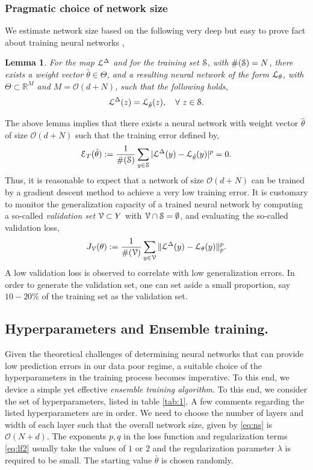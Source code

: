 \documentclass[a4paper]{article}
\numberwithin{equation}{section}
\newtheorem{lemma}[theorem]{Lemma}
\numberwithin{equation}{section}
\theoremstyle{definition}
\theoremstyle{myremarkstyle}
\newcommand{\R}{\mathbb{R}}
\newcommand{\cO}{{\mathcal O}}
\newcommand{\map}{\EuScript{L}}
\newcommand{\train}{\EuScript{S}}
\newcommand{\val}{\EuScript{V}}
\newcommand{\er}{\EuScript{E}}
\begin{document}
\subsubsection{Pragmatic choice of network size}
We estimate network size based on the following very deep but easy to prove fact about training neural networks \cite{REC1},
\begin{lemma}
\label{lem:1}
For the map $\map^{\Delta}$ and for the training set $\train$, with $\#(\train) = N$, there exists a weight vector $\hat{\theta} \in \Theta$, and a resulting neural network of the form $\map_{\theta}$, with $\Theta \subset \R^M$ and $M = {\mathcal O} (d + N)$, such that the following holds,
\begin{equation}
\label{eq:lem1}
\map^{\Delta}(z) = \map_{\hat{\theta}} (z), \quad \forall~ z \in \train.
\end{equation}
\end{lemma}
The above lemma implies that there exists a neural network with weight vector $\hat{\theta}$  of size ${\mathcal O}(d+N)$ such that the training error defined by,
\begin{equation}
\label{eq:ert}
\er_{T} (\hat{\theta}) : = \frac{1}{\#(\train)}\sum\limits_{y \in \train} |\map^{\Delta}(y) - \map_{\hat{\theta}} (y) |^p = 0.
\end{equation}
Thus, it is reasonable to expect that a network of size $\cO(d + N)$ can be trained by a gradient descent method to achieve a very low training error.
It is customary to monitor the generalization capacity of a trained neural network by computing a so-called \emph{validation set} $\val \subset Y$ with $\val \cap \train = \emptyset$, and evaluating the so-called validation loss,
\begin{equation}
\label{eq:vlf}
J_{\val} (\theta) : = \frac{1}{\#(\val)}\sum\limits_{y \in \val} \|\map^{\Delta}(y) - \map_{\theta} (y) \|_p^p.
\end{equation}
A low validation loss is observed to correlate with low generalization errors. In order to generate the validation set, one can set aside a small proportion, say $10-20\%$ of the training set as the validation set. 
\subsection{Hyperparameters and Ensemble training.}
Given the theoretical challenges of determining neural networks that can provide low prediction errors in our data poor regime, a suitable choice of the hyperparameters in the training process becomes imperative. To this end, we device a simple yet effective \emph{ensemble training algorithm}. To this end, we consider the set of hyperparameters, listed in table \ref{tab:1}. A few comments regarding the listed hyperparameters are in order. We need to choose the number of layers and width of each layer such that the overall network size, given by \eqref{eq:ns} is $\cO(N+d)$. The exponents $p,q$ in the loss function and regularization terms \eqref{eq:lf2} usually take the values of $1$ or $2$ and the regularization parameter $\lambda$ is required to be small. The starting value $\bar{\theta}$ is chosen randomly. 
\end{document}
